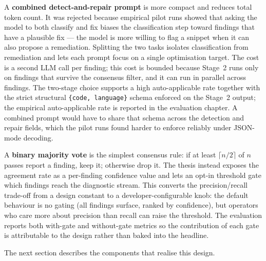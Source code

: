 A \textbf{combined detect-and-repair prompt} is more compact and reduces total token count. It was rejected because empirical pilot runs showed that asking the model to both classify and fix biases the classification step toward findings that have a plausible fix --- the model is more willing to flag a snippet when it can also propose a remediation. Splitting the two tasks isolates classification from remediation and lets each prompt focus on a single optimisation target. The cost is a second LLM call per finding; this cost is bounded because Stage~2 runs only on findings that survive the consensus filter, and it can run in parallel across findings. The two-stage choice supports a high auto-applicable rate together with the strict structural \texttt{\{code, language\}} schema enforced on the Stage~2 output; the empirical auto-applicable rate is reported in the evaluation chapter. A combined prompt would have to share that schema across the detection and repair fields, which the pilot runs found harder to enforce reliably under JSON-mode decoding.

A \textbf{binary majority vote} is the simplest consensus rule: if at least $\lceil n/2 \rceil$ of $n$ passes report a finding, keep it; otherwise drop it. The thesis instead exposes the agreement rate as a per-finding confidence value and lets an opt-in threshold gate which findings reach the diagnostic stream. This converts the precision/recall trade-off from a design constant to a developer-configurable knob: the default behaviour is no gating (all findings surface, ranked by confidence), but operators who care more about precision than recall can raise the threshold. The evaluation reports both with-gate and without-gate metrics so the contribution of each gate is attributable to the design rather than baked into the headline.

The next section describes the components that realise this design.

